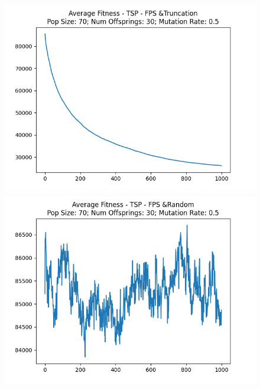 \documentclass[12pt]{report}
\theoremstyle{mytheoremstyle}
\theoremstyle{mytheoremstyle}
\theoremstyle{myproblemstyle}
\begin{document}
\begin{figure}[!]
	\begin{minipage}{0.4\textwidth}
		\includegraphics[width=\linewidth]{../Analysis/ASF_TSP_0_3_70_30.png}
	\end{minipage}
	\hspace{\fill}
	\begin{minipage}{0.4\textwidth}
		\includegraphics[width=\linewidth]{../Analysis/ASF_TSP_0_4_70_30.png}
	\end{minipage}
	\vspace*{1cm}
	\begin{minipage}{0.4\textwidth}

\end{minipage}
\end{figure}
\end{document}
